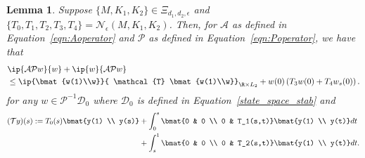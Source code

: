 \documentclass[9pt,journal,twocolumn]{IEEEtran}
\newtheorem{lemma}{Lemma}
\newcommand{\igzs}{\int_0^s}
\newcommand{\igso}{\int_s^1}
\begin{document}
\begin{lemma}\label{lem:dual}
Suppose $\{M,K_1,K_2\} \in \Xi_{d_1,d_2,\epsilon}$ and $\{T_0,T_1,T_2,T_3,T_4\}=\mathcal{N}_\epsilon(M,K_1,K_2)$. Then, for $\mathcal{A}$ as defined in Equation~\eqref{eqn:Aoperator} and $\mathcal{P}$ as defined in Equation~\eqref{eqn:Poperator}, we have that
\begin{align*}
&\ip{\mathcal{A}\mathcal{P}w}{w}+\ip{w}{\mathcal{A}\mathcal{P}w} \\
&\le  \ip{\bmat{w(1)\\w}}{ \mathcal{T} \bmat{w(1)\\w}}_{\R \times L_2} +w(0)\left(T_3 w(0) + T_4 w_s(0) \right).
\end{align*}
for any $w \in \mathcal{P}^{-1}\mathcal{D}_0$ where $\mathcal{D}_0$ is defined in Equation~\eqref{state_space_stab} and
\begin{align*}
(\mathcal{T}y)(s) := T_0(s)\bmat{y(1) \\ y(s)} &+   \igzs  \bmat{0 & 0 \\ 0 & T_1(s,t)} \bmat{y(1) \\ y(t)} dt \\
& + \igso  \bmat{0 & 0 \\ 0 & T_2(s,t)} \bmat{y(1) \\ y(t)} dt.
\end{align*}
\end{lemma}
\end{document}
